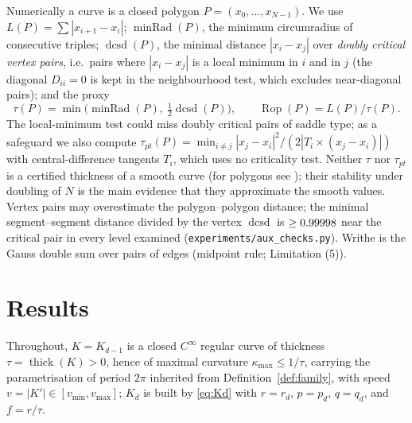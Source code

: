 \documentclass[10pt,a4paper]{article}
\theoremstyle{plain}
\theoremstyle{definition}
\theoremstyle{remark}
\newcommand{\thick}{\operatorname{thick}}
\newcommand{\Rop}{\operatorname{Rop}}
\newcommand{\minRad}{\operatorname{minRad}}
\newcommand{\dcsd}{\operatorname{dcsd}}
\begin{document}
Numerically a curve is a closed polygon $P=(x_0,\dots,x_{N-1})$. We use $L(P)=\sum|x_{i+1}-x_i|$; $\minRad(P)$, the minimum circumradius of consecutive triples; $\dcsd(P)$, the minimal distance $|x_i-x_j|$ over \emph{doubly critical vertex pairs}, i.e.\ pairs where $|x_i-x_j|$ is a local minimum in $i$ and in $j$ (the diagonal $D_{ii}=0$ is kept in the neighbourhood test, which excludes near-diagonal pairs); and the proxy
\begin{equation}\label{eq:tau}
\tau(P)=\min\bigl(\minRad(P),\ \tfrac12\dcsd(P)\bigr),\qquad \Rop(P)=L(P)/\tau(P).
\end{equation}
The local-minimum test could miss doubly critical pairs of saddle type; as a safeguard we also compute $\tau_{pt}(P)=\min_{i\ne j}|x_j-x_i|^2/(2|T_i\times(x_j-x_i)|)$ with central-difference tangents $T_i$, which uses no criticality test. Neither $\tau$ nor $\tau_{pt}$ is a certified thickness of a smooth curve (for polygons see \cite{Rawdon2003}); their stability under doubling of $N$ is the main evidence that they approximate the smooth values. Vertex pairs may overestimate the polygon--polygon distance; the minimal segment--segment distance divided by the vertex $\dcsd$ is $\ge0.99998$ near the critical pair in every level examined (\texttt{experiments/aux\_checks.py}). Writhe is the Gauss double sum over pairs of edges (midpoint rule; Limitation (5)).

\section{Results}\label{sec:theory}

Throughout, $K=K_{d-1}$ is a closed $C^\infty$ regular curve of thickness $\tau=\thick(K)>0$, hence of maximal curvature $\kappa_{\max}\le1/\tau$, carrying the parametrisation of period $2\pi$ inherited from Definition~\ref{def:family}, with speed $v=|K'|\in[v_{\min},v_{\max}]$; $K_d$ is built by \eqref{eq:Kd} with $r=r_d$, $p=p_d$, $q=q_d$, and $f=r/\tau$.
\end{document}
